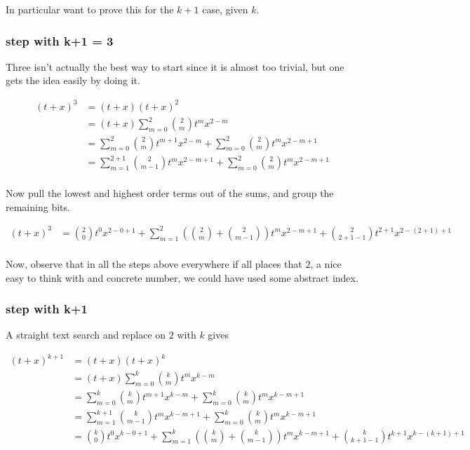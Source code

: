 In particular want to prove this for the $k+1$ case, given $k$.

\subsubsection{step with k+1 = 3 }

Three isn't actually the best way to start since it is almost too trivial, but
one gets the idea easily by doing it.

\begin{align*}
(t + x)^3 
&= (t + x)(t + x)^2  \\
&= (t + x)\sum_{m=0}^2 \binom{2}{m} t^m x^{2-m} \\
&= 
\sum_{m=0}^2 \binom{2}{m} t^{m+1} x^{2-m} 
+ \sum_{m=0}^2 \binom{2}{m} t^{m} x^{2-m + 1} \\
&= 
\sum_{m=1}^{2 + 1} \binom{2}{m-1} t^{m} x^{2 - m + 1} 
+ \sum_{m=0}^2 \binom{2}{m} t^{m} x^{2-m + 1} \\
\end{align*}

Now pull the lowest and highest order terms out of the sums, and group the
remaining bits.

\begin{align*}
(t + x)^3 
&= 
 \binom{2}{0} t^{0} x^{2 - 0 + 1} 
+ \sum_{m=1}^{2} \left( \binom{2}{m} + \binom{2}{m-1} \right) t^{m} x^{2 - m + 1} 
+ \binom{2}{2 + 1 -1} t^{2 + 1} x^{2 - (2 + 1) + 1} 
\\
\end{align*}

Now, observe that in all the steps above everywhere if all places that $2$, a nice easy to think with and concrete number, we could have used some
abstract index.

\subsubsection{step with k+1 }

A straight text search and replace on $2$ with $k$ gives

\begin{align*}
(t + x)^{k+1}
&= (t + x)(t + x)^k  \\
&= (t + x)\sum_{m=0}^k \binom{k}{m} t^m x^{k-m} \\
&= 
\sum_{m=0}^k \binom{k}{m} t^{m+1} x^{k-m} 
+ \sum_{m=0}^k \binom{k}{m} t^{m} x^{k-m + 1} \\
&= 
\sum_{m=1}^{k + 1} \binom{k}{m-1} t^{m} x^{k - m + 1} 
+ \sum_{m=0}^k \binom{k}{m} t^{m} x^{k-m + 1} \\
&= 
 \binom{k}{0} t^{0} x^{k - 0 + 1} 
+ \sum_{m=1}^{k} \left( \binom{k}{m} + \binom{k}{m-1} \right) t^{m} x^{k - m + 1} 
+ \binom{k}{k + 1 -1} t^{k + 1} x^{k - (k + 1) + 1} \\
\end{align*}

